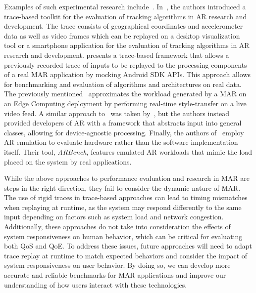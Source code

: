 Examples of such experimental research include~\cite{williams2013transform,munro2016aaremu,george2020openrtist,choi2022emulating,chetoui2022arbench}.
In~\cite{williams2013transform}, the authors introduced a trace-based toolkit for the evaluation of tracking algorithms in \gls{AR} research and development.
The trace consists of geographical coordinates and accelerometer data as well as video frames which can be replayed on a desktop visualization tool or a smartphone application for the evaluation of tracking algorithms in \gls{AR} research and development.\@
\cite{munro2016aaremu} presents a trace-based framework that allows a previously recorded trace of inputs to be replayed to the processing components of a real \gls{MAR} application by mocking Android \gls{SDK} \glspl{API}.
This approach allows for benchmarking and evaluation of algorithms and architectures on real data.
The previously mentioned~\cite{george2020openrtist} approximates the workload generated by a \gls{MAR} on an Edge Computing deployment by performing real-time style-transfer on a live video feed. 
A similar approach to~\cite{munro2016aaremu} was taken by~\cite{choi2022emulating}, but the authors instead provided developers of \gls{AR} with a framework that abstracts input into general classes, allowing for device-agnostic processing.
Finally, the authors of~\cite{chetoui2022arbench} employ \gls{AR} emulation to evaluate hardware rather than the software implementation itself.
Their tool, \emph{ARBench}, features emulated \gls{AR} workloads that mimic the load placed on the system by real applications.

While the above approaches to performance evaluation and research in \gls{MAR} are steps in the right direction, they fail to consider the dynamic nature of \gls{MAR}.
The use of rigid traces in trace-based approaches can lead to timing mismatches when replaying at runtime, as the system may respond differently to the same input depending on factors such as system load and network congestion.
Additionally, these approaches do not take into consideration the effects of system responsiveness on human behavior, which can be critical for evaluating both \gls{QoS} and \gls{QoE}.
To address these issues, future approaches will need to adapt trace replay at runtime to match expected behaviors and consider the impact of system responsiveness on user behavior.
By doing so, we can develop more accurate and reliable benchmarks for \gls{MAR} applications and improve our understanding of how users interact with these technologies.

